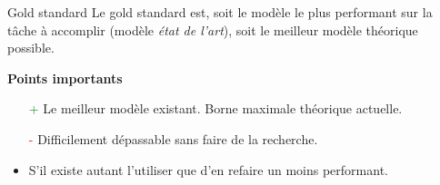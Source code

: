 \begin{frame}{Gold standard}
  Le gold standard est, soit le modèle le plus performant sur la tâche à accomplir (modèle \emph{état de l'art}), soit le meilleur modèle théorique possible.

\textbf{Points importants}
\begin{itemize}
  \item[\textcolor{green}{+}] Le meilleur modèle existant. Borne maximale théorique actuelle.
  \item[\textcolor{red}{-}] Difficilement dépassable sans faire de la recherche.
  \item S'il existe autant l'utiliser que d'en refaire un moins performant.
\end{itemize}
\end{frame}